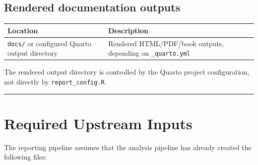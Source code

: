 \documentclass[
  letterpaper,
  DIV=11,
  numbers=noendperiod,
  openany,
  oneside]{scrreprt}
\begin{document}
\subsection*{Rendered documentation
outputs}\label{rendered-documentation-outputs}

\begin{longtable}[]{@{}
  >{\raggedright\arraybackslash}p{}
  >{\raggedright\arraybackslash}p{}@{}}
\toprule\noalign{}
\begin{minipage}[b]{\linewidth}\raggedright
Location
\end{minipage} & \begin{minipage}[b]{\linewidth}\raggedright
Description
\end{minipage} \\
\midrule\noalign{}
\endhead
\bottomrule\noalign{}
\endlastfoot
\texttt{docs/} or configured Quarto output directory & Rendered
HTML/PDF/book outputs, depending on \texttt{\_quarto.yml} \\
\end{longtable}

The rendered output directory is controlled by the Quarto project
configuration, not directly by \texttt{report\_config.R}.

\begin{center}\rule{0.5\linewidth}{0.5pt}\end{center}

\section*{Required Upstream Inputs}\label{required-upstream-inputs}


The reporting pipeline assumes that the analysis pipeline has already
created the following files:
\end{document}
